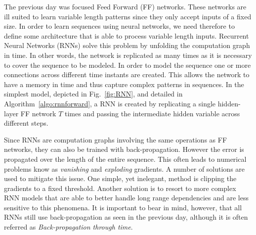 The previous day was focused Feed Forward (FF) networks. These networks are ill
suited to learn variable length patterns since they only accept inputs of a
fixed size. In order to learn sequences using neural networks, we need therefore
to define some architecture that is able to process variable length inputs.
Recurrent Neural Networks (RNNs) solve this problem by unfolding the
computation graph in time. In other words, the network is replicated as many
times as it is necessary to cover the sequence to be modeled. In order
to model the sequence one or more connections across different time instants are
created. This allows the network to have a memory in time and thus capture
complex patterns in sequences. In the simplest model, depicted in
Fig.~\ref{fig:RNN}, and detailed in Algorithm~\ref{algo:rnnforward}, a RNN is
created by replicating a single hidden-layer FF network $T$ times and passing
the intermediate hidden variable across different steps. 

Since RNNs are computation graphs involving the same operations as FF networks,
they can also be trained with back-propagation. However the error is
 propagated over the length of the entire sequence. This often leads to 
numerical problems know as \textit{vanishing} and \textit{exploding} gradients.
A number of solutions are used to mitigate this issue. One simple, yet inelegant,
method is clipping the gradients to a fixed threshold. Another solution is to resort to more complex 
RNN models that are able to better handle long range dependencies and are less
sensitive to this phenomena. It is important to bear in mind, however, that
all RNNs still use back-propagation as seen in the previous day, although it is
often referred as \textit{Back-propagation through time}. 


